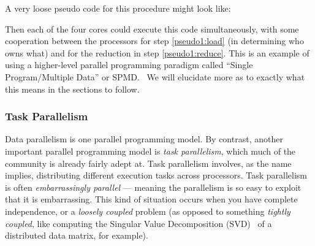 A very loose pseudo code for this procedure might look like:


Then each of the four cores could execute this code simultaneously, with some
cooperation between the processors for step \ref{pseudo1:load} (in determining
who owns what) and for the reduction in step \ref{pseudo1:reduce}. This is
an example of using a higher-level parallel programming paradigm called
``Single Program/Multiple Data''
or SPMD.~
We will elucidate more as to exactly what this means in the sections to follow.



\subsubsection{Task Parallelism}

Data parallelism is one parallel programming model. By contrast, another
important parallel programming model is
\emph{task parallelism},
which much of the  community is already fairly adept at. Task
parallelism involves, as the name implies, distributing different execution
tasks across processors. Task parallelism is often
\emph{embarrassingly parallel} ---
meaning the parallelism is so easy to exploit that it is embarrassing. This
kind of situation occurs when you have complete independence, or a
\emph{loosely coupled} problem (as opposed to something \emph{tightly coupled},
like computing the Singular Value Decomposition
(SVD)~ of a
distributed data matrix, for example).  

